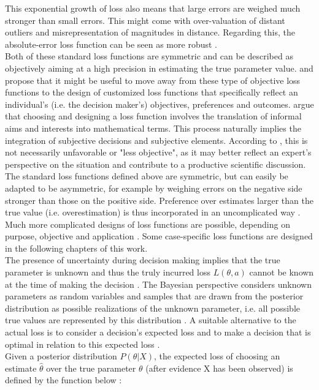         This exponential growth of loss also means that large errors are weighed much stronger than small errors. This might come with over-valuation of distant outliers and misrepresentation of magnitudes in distance. Regarding this, the absolute-error loss function can be seen as more robust \citep{davidson2015}.\\
        Both of these standard loss functions are symmetric and can be described as objectively aiming at a high precision in estimating the true parameter value.
        \citet{davidson2015} and \citet{hennig2007} propose that it might be useful to move away from these type of objective loss functions to the design of customized loss functions that specifically reflect an individual's (i.e. the decision maker's) objectives, preferences and outcomes. \citet{hennig2007} argue that choosing and designing a loss function involves the translation of informal aims and interests into mathematical terms. This process naturally implies the integration of subjective decisions and subjective elements. According to \citet{hennig2007}, this is not necessarily unfavorable or "less objective", as it may better reflect an expert's perspective on the situation and contribute to a productive scientific discussion.\\        
        The standard loss functions defined above are symmetric, but can easily be adapted to be asymmetric, for example by weighing errors on the negative side stronger than those on the positive side. Preference over estimates larger than the true value (i.e. overestimation) is thus incorporated in an uncomplicated way \citep{davidson2015, hennig2007}. Much more complicated designs of loss functions are possible, depending on purpose, objective and application \citep{davidson2015}. Some case-specific loss functions are designed in the following chapters of this work. \\
        The presence of uncertainty during decision making implies that the true parameter is unknown and thus the truly incurred loss $L(\theta,a)$ cannot be known at the time of making the decision \citep{berger2013stat, davidson2015}. The Bayesian perspective considers unknown parameters as random variables and samples that are drawn from the posterior distribution as possible realizations of the unknown parameter, i.e. all possible true values are represented by this distribution \citep{davidson2015}. A suitable alternative to the actual loss is to consider a decision's expected loss and to make a decision that is optimal in relation to this expected loss \citep{berger2013stat}. \\        
        Given a posterior distribution $P(\theta|X)$, the expected loss of choosing an estimate $\hat{\theta}$ over the true parameter $\theta$ (after evidence X has been observed) is defined by the function below \citep{davidson2015}:
        
